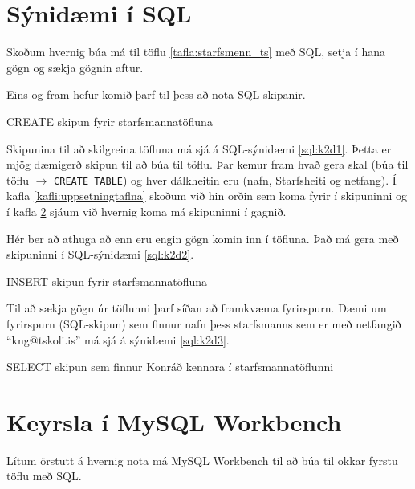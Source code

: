 \section{Sýnidæmi í SQL}
\label{undirkafli:synidaemi_i_sql}
Skoðum hvernig búa má til töflu \ref{tafla:starfsmenn_ts} með SQL, setja í hana gögn og sækja gögnin aftur. 

Eins og fram hefur komið þarf til þess að nota SQL-skipanir.

\begin{example}[h]
\caption{CREATE skipun fyrir starfsmannatöfluna}
\label{sql:k2d1}
\centering
{}
\end{example}

Skipunina til að skilgreina töfluna má sjá á SQL-sýnidæmi \ref{sql:k2d1}. Þetta er mjög dæmigerð skipun til að búa til töflu. Þar kemur fram hvað gera skal (búa til töflu $\rightarrow$ \verb|CREATE TABLE|) og hver dálkheitin eru (nafn, Starfsheiti og netfang). Í kafla \ref{kafli:uppsetningtaflna} skoðum við hin orðin sem koma fyrir í skipuninni og í kafla \ref{undirkafli:keyrslaiworkbench} sjáum við hvernig koma má skipuninni í gagnið.

Hér ber að athuga að enn eru engin gögn komin inn í töfluna. Það má gera með skipuninni í SQL-sýnidæmi \ref{sql:k2d2}.

\begin{example}[h]
\caption{INSERT skipun fyrir starfsmannatöfluna}
\label{sql:k2d2}
\centering
{\small
{}
}
\end{example}

Til að sækja gögn úr töflunni þarf síðan að framkvæma fyrirspurn. Dæmi um fyrirspurn (SQL-skipun) sem finnur nafn þess starfsmanns sem er með netfangið ``kng@tskoli.is'' má sjá á sýnidæmi \ref{sql:k2d3}.

\begin{example}[h]
\caption{SELECT skipun sem finnur Konráð kennara í starfsmannatöflunni}
\label{sql:k2d3}
\centering
{}
\end{example}

\section{Keyrsla í MySQL Workbench}
\label{undirkafli:keyrslaiworkbench}
Lítum örstutt á hvernig nota má MySQL Workbench til að búa til okkar fyrstu töflu með SQL.


